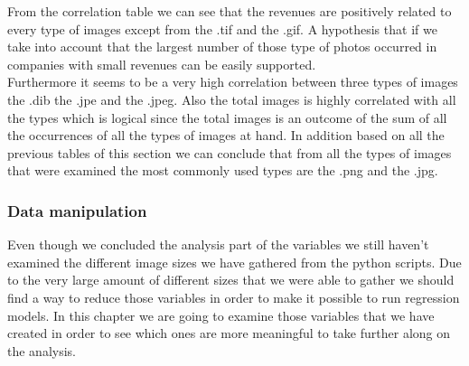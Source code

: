 \documentclass{article}
\begin{document}
From the correlation table we can see that the revenues are positively related to every type of images except from the .tif and the .gif. A hypothesis that if we take into account that the largest number of those type of photos occurred in companies with small revenues can be easily supported.\\
Furthermore it seems to be a very high correlation between three types of images the .dib the .jpe and the .jpeg. Also the total images is highly correlated with all the types which is logical since the total images is an outcome of the sum of all the occurrences of all the types of images at hand. In addition based on all the previous tables of this section we can conclude that from all the types of images that were examined the most commonly used types are the .png and the .jpg.
\subsubsection{Data manipulation}
Even though we concluded the analysis part of the variables we still haven't examined the different image sizes we have gathered from the python scripts. Due to the very large amount of different sizes that we were able to gather we should find a way to reduce those variables in order to make it possible to run regression models. In this chapter we are going to examine those variables that we have created in order to see which ones are more meaningful to take further along on the analysis.
\end{document}
